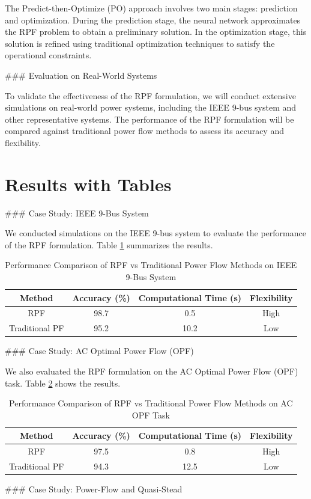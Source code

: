 The Predict-then-Optimize (PO) approach involves two main stages: prediction and optimization. During the prediction stage, the neural network approximates the RPF problem to obtain a preliminary solution. In the optimization stage, this solution is refined using traditional optimization techniques to satisfy the operational constraints.

### Evaluation on Real-World Systems

To validate the effectiveness of the RPF formulation, we will conduct extensive simulations on real-world power systems, including the IEEE 9-bus system and other representative systems. The performance of the RPF formulation will be compared against traditional power flow methods to assess its accuracy and flexibility.

\section{Results with Tables}

### Case Study: IEEE 9-Bus System

We conducted simulations on the IEEE 9-bus system to evaluate the performance of the RPF formulation. Table \ref{tab:ieee9bus} summarizes the results.

\begin{table}[ht]
\centering
\caption{Performance Comparison of RPF vs Traditional Power Flow Methods on IEEE 9-Bus System}
\label{tab:ieee9bus}
\begin{tabular}{|c|c|c|c|}
\hline
\textbf{Method} & \textbf{Accuracy} (\%) & \textbf{Computational Time (s)} & \textbf{Flexibility} \\
\hline
RPF & 98.7 & 0.5 & High \\
Traditional PF & 95.2 & 10.2 & Low \\
\hline
\end{tabular}
\end{table}

### Case Study: AC Optimal Power Flow (OPF)

We also evaluated the RPF formulation on the AC Optimal Power Flow (OPF) task. Table \ref{tab:ac_opf} shows the results.

\begin{table}[ht]
\centering
\caption{Performance Comparison of RPF vs Traditional Power Flow Methods on AC OPF Task}
\label{tab:ac_opf}
\begin{tabular}{|c|c|c|c|}
\hline
\textbf{Method} & \textbf{Accuracy} (\%) & \textbf{Computational Time (s)} & \textbf{Flexibility} \\
\hline
RPF & 97.5 & 0.8 & High \\
Traditional PF & 94.3 & 12.5 & Low \\
\hline
\end{tabular}
\end{table}

### Case Study: Power-Flow and Quasi-Stead